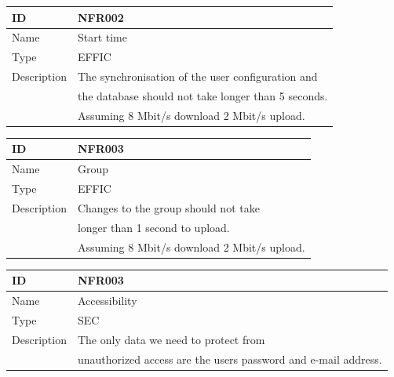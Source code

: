 \documentclass[12pt]{article}
\theoremstyle{definition}
\begin{document}
\vspace*{1 cm}

\begin{flushleft}
  \begin{tabular}{|l|L{10cm}|}
  \hline
  ID &  NFR002\\ \hline
  Name & Start time \\ \hline
  Type &  EFFIC\\ \hline
  Description & The synchronisation of the user configuration and \\
  & the database should not take longer than 5 seconds. \\ 
  & Assuming 8 Mbit/s download 2 Mbit/s upload. \\ \hline
  \end{tabular}
\end{flushleft}

\vspace*{1 cm}

\begin{flushleft}
  \begin{tabular}{|l|L{10cm}|}
  \hline
  ID &  NFR003\\ \hline
  Name & Group \\ \hline
  Type &  EFFIC\\ \hline
  Description & Changes to the group should not take \\
  & longer than 1 second to upload. \\ 
  & Assuming 8 Mbit/s download 2 Mbit/s upload. \\ \hline
  \end{tabular}
\end{flushleft}

\vspace*{1 cm}

\begin{flushleft}
  \begin{tabular}{|l|L{10cm}|}
  \hline
  ID &  NFR003\\ \hline
  Name & Accessibility \\ \hline
  Type &  SEC \\ \hline
  Description & The only data we need to protect from \\
  & unauthorized access are the users password and e-mail address. \\ \hline
  \end{tabular}
\end{flushleft}

\pagebreak
\end{document}
